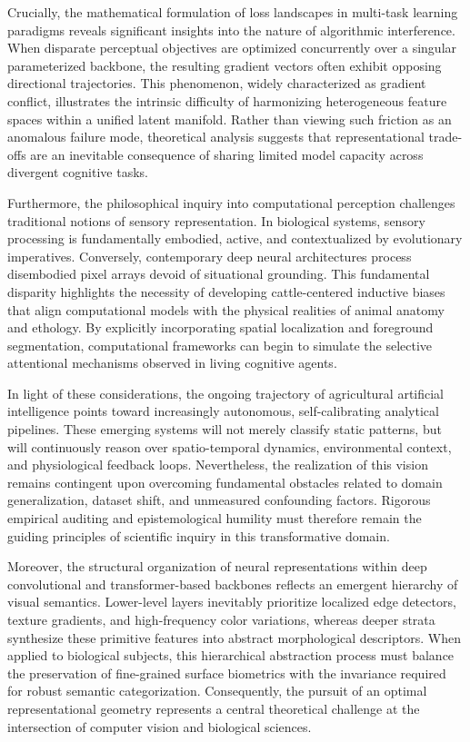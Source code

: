\documentclass[Times,12pt,oneside,openany,print,index]{report}
\begin{document}
Crucially, the mathematical formulation of loss landscapes in multi-task learning paradigms reveals significant insights into the nature of algorithmic interference. When disparate perceptual objectives are optimized concurrently over a singular parameterized backbone, the resulting gradient vectors often exhibit opposing directional trajectories. This phenomenon, widely characterized as gradient conflict, illustrates the intrinsic difficulty of harmonizing heterogeneous feature spaces within a unified latent manifold. Rather than viewing such friction as an anomalous failure mode, theoretical analysis suggests that representational trade-offs are an inevitable consequence of sharing limited model capacity across divergent cognitive tasks.

Furthermore, the philosophical inquiry into computational perception challenges traditional notions of sensory representation. In biological systems, sensory processing is fundamentally embodied, active, and contextualized by evolutionary imperatives. Conversely, contemporary deep neural architectures process disembodied pixel arrays devoid of situational grounding. This fundamental disparity highlights the necessity of developing cattle-centered inductive biases that align computational models with the physical realities of animal anatomy and ethology. By explicitly incorporating spatial localization and foreground segmentation, computational frameworks can begin to simulate the selective attentional mechanisms observed in living cognitive agents.

In light of these considerations, the ongoing trajectory of agricultural artificial intelligence points toward increasingly autonomous, self-calibrating analytical pipelines. These emerging systems will not merely classify static patterns, but will continuously reason over spatio-temporal dynamics, environmental context, and physiological feedback loops. Nevertheless, the realization of this vision remains contingent upon overcoming fundamental obstacles related to domain generalization, dataset shift, and unmeasured confounding factors. Rigorous empirical auditing and epistemological humility must therefore remain the guiding principles of scientific inquiry in this transformative domain.

Moreover, the structural organization of neural representations within deep convolutional and transformer-based backbones reflects an emergent hierarchy of visual semantics. Lower-level layers inevitably prioritize localized edge detectors, texture gradients, and high-frequency color variations, whereas deeper strata synthesize these primitive features into abstract morphological descriptors. When applied to biological subjects, this hierarchical abstraction process must balance the preservation of fine-grained surface biometrics with the invariance required for robust semantic categorization. Consequently, the pursuit of an optimal representational geometry represents a central theoretical challenge at the intersection of computer vision and biological sciences.
\end{document}
